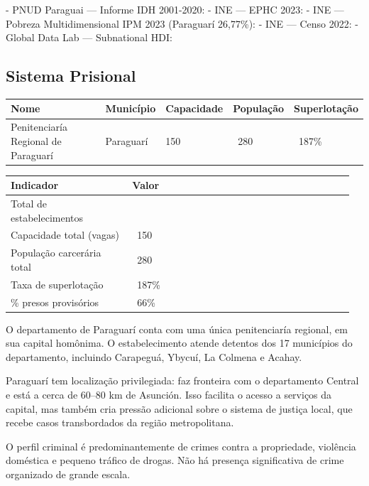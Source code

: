 - PNUD Paraguai --- Informe IDH 2001-2020: 
- INE --- EPHC 2023: 
- INE --- Pobreza Multidimensional IPM 2023 (Paraguarí 26,77\%): 
- INE --- Censo 2022: 
- Global Data Lab --- Subnational HDI: 


\subsection{Sistema Prisional}



{\small
\setlength{\tabcolsep}{3pt}
\renewcommand{\arraystretch}{1.12}
{\small
\begin{tabularx}{\linewidth}{lXXXX}
\toprule
Nome & Município & Capacidade & População & Superlotação \\
\midrule
Penitenciaría Regional de Paraguarí & Paraguarí & 150 & ~280 & ~187\% \\
\bottomrule
\end{tabularx}
}
}


{\small
\setlength{\tabcolsep}{3pt}
\renewcommand{\arraystretch}{1.12}
\begin{tabularx}{\linewidth}{>{\raggedright\arraybackslash}p{0.34\linewidth} >{\raggedright\arraybackslash}p{0.62\linewidth}}
\toprule
Indicador & Valor \\
\midrule
Total de estabelecimentos & 1 \\
Capacidade total (vagas) & ~150 \\
População carcerária total & ~280 \\
Taxa de superlotação & ~187\% \\
\% presos provisórios & ~66\% \\
\bottomrule
\end{tabularx}
}


O departamento de Paraguarí conta com uma única penitenciaría regional, em sua capital homônima. O estabelecimento atende detentos dos 17 municípios do departamento, incluindo Carapeguá, Ybycuí, La Colmena e Acahay.

Paraguarí tem localização privilegiada: faz fronteira com o departamento Central e está a cerca de 60--80 km de Asunción. Isso facilita o acesso a serviços da capital, mas também cria pressão adicional sobre o sistema de justiça local, que recebe casos transbordados da região metropolitana.

O perfil criminal é predominantemente de crimes contra a propriedade, violência doméstica e pequeno tráfico de drogas. Não há presença significativa de crime organizado de grande escala.

